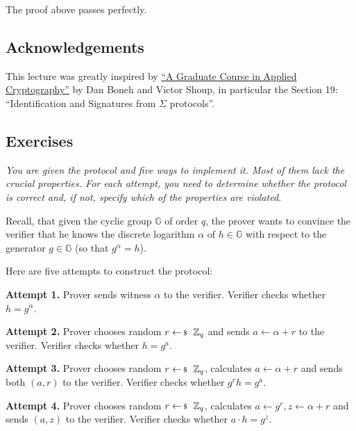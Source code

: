 \documentclass[../lecture-notes-148x210.tex]{subfiles}
\begin{document}
The proof above passes perfectly.

\subsection*{Acknowledgements}

This lecture was greatly inspired by \href{https://toc.cryptobook.us/}{``A
Graduate Course in Applied Cryptography''} by Dan Boneh and Victor Shoup, in
particular the Section 19: ``Identification and Signatures from $\Sigma$
protocols''.

\subsection{Exercises}

\begin{tcolorbox}[breakable, colback=gray!10!white,fonttitle=\bfseries,colframe=purple!80!black,title=Exercises 1-5. In search of correct Schnorr's Identification Protocol\ldots]
    \textit{You are given the protocol and five ways to implement it. Most of them lack the crucial properties. For each attempt, you need to determine whether the protocol is correct and, if not, specify which of the properties are violated.}
    \vspace{2px}
 
    Recall, that given the cyclic group $\mathbb{G}$ of order $q$, the prover wants to convince the verifier that he knows the discrete logarithm $\alpha$ of $h \in \mathbb{G}$ with respect to the generator $g \in \mathbb{G}$ (so that $g^{\alpha}=h$).

    Here are five attempts to construct the protocol:

    \textcolor{purple!80!black}{\textbf{Attempt 1.}} Prover sends witness $\alpha$ to the verifier. Verifier checks whether $h = g^{\alpha}$.

    \textcolor{purple!80!black}{\textbf{Attempt 2.}} Prover chooses random $r \leftarrowS \mathbb{Z}_q$ and sends $a \gets \alpha + r$ to the verifier. Verifier checks whether $h = g^a$.

    \textcolor{purple!80!black}{\textbf{Attempt 3.}} Prover chooses random $r \leftarrowS \mathbb{Z}_q$, calculates $a \gets \alpha + r$ and sends both $(a,r)$ to the verifier. Verifier checks whether $g^r h = g^a$.

    \textcolor{purple!80!black}{\textbf{Attempt 4.}} Prover chooses random $r \leftarrowS \mathbb{Z}_q$, calculates $a \gets g^r, z \gets \alpha+r$ and sends $(a,z)$ to the verifier. Verifier checks whether $a \cdot h = g^z$.


\end{tcolorbox}
\end{document}
